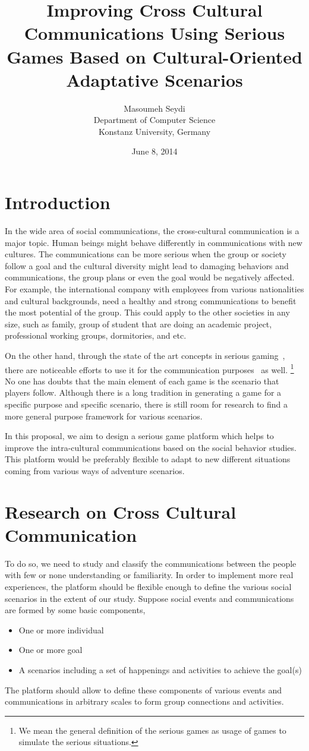 \documentclass[conference]{IEEEtran}
\title{Improving Cross Cultural Communications Using Serious Games
Based on Cultural-Oriented Adaptative Scenarios}
\date{June 8, 2014}
\author{Masoumeh Seydi\\ Department of Computer Science\\
       Konstanz University, Germany}
\begin{document}
\maketitle

\section{Introduction}

In the wide area of social communications, the cross-cultural communication is 
a major topic. Human beings might behave differently in communications with
new cultures. The communications can be more serious when the group or society 
follow a goal and the cultural diversity might lead to damaging behaviors and communications,
the group plans or even the goal would be negatively affected.
For example, the international company with employees from various nationalities
and cultural backgrounds, need a healthy and strong communications to benefit the most potential
of the group. This could apply to the other societies in any size, such as family, group of student that
are doing an academic project, professional working groups, dormitories, and etc. 

On the other hand, through the state of the art concepts in serious gaming~\cite{sergame1,sergame2}, 
there are noticeable efforts to use it for the communication purposes~\cite{sergame3} as well.
\footnote{We mean the general definition of the serious games as 
usage of games to simulate the serious situations.}
No one has doubts that the main element of each game is 
the scenario that players follow.
Although there is a long tradition in generating a game
for a specific purpose and specific scenario, 
there is still room for research 
to find a more general purpose framework for various scenarios.

In this proposal, we aim to design a serious game platform which helps to 
improve the intra-cultural communications based on the social behavior studies.
This platform would be preferably flexible to adapt to new different situations coming
from various ways of adventure scenarios. 

\section{Research on Cross Cultural Communication}

To do so, we need to study and classify the 
communications between the people with few or none understanding or familiarity. In order to implement 
more real experiences, the platform should be flexible enough to define the various social scenarios in the extent of our study.
Suppose social events and communications are formed by some basic components,
\begin{itemize}
\item One or more individual
\item One or more goal
\item A scenarios including a set of happenings and activities to achieve the goal(s)
\end{itemize}
The platform should allow to define these components of various events and communications in 
arbitrary scales to form group connections and activities. 
\end{document}
